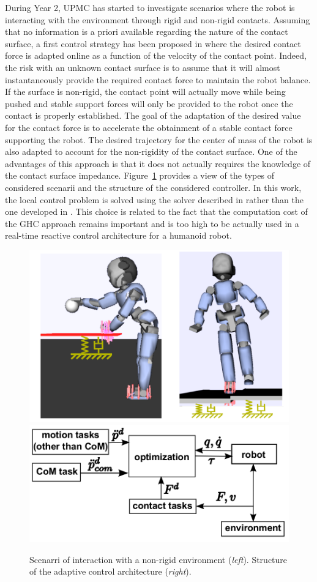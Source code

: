 During Year 2, UPMC has started to investigate scenarios where the robot is interacting with the environment through rigid and non-rigid contacts. Assuming that no information is a priori available regarding the nature of the contact surface, a first control strategy has been proposed in \cite{LiuIROS2015} where the desired contact force is adapted online as a function of the velocity of the contact point. Indeed, the risk with an unknown contact surface is to assume that it will almost instantaneously provide the required contact force to maintain the robot balance. If the surface is non-rigid, the contact point will actually move while being pushed and stable support forces will only be provided to the robot once the contact is properly established. The goal of the adaptation of the desired value for the contact force is to accelerate the obtainment of a stable contact force supporting the robot. The desired trajectory for the center of mass of the robot is also adapted to account for the non-rigidity of the contact surface. One of the advantages of this approach is that it does not actually requires the knowledge of the contact surface impedance. Figure~\ref{fig:LIU_IROS_2015} provides a view of the types of considered scenarii and the structure of the considered controller. In this work, the local control problem is solved using the solver described in \cite{salini2012} rather than the one developed in \cite{LiuGHC}. This choice is related to the fact that the computation cost of the GHC approach remains important and is too high to be actually used in a real-time reactive control architecture for a humanoid robot.\\

\begin{figure}[h!]
\centering
\includegraphics[width=0.45\linewidth]{images/LIU_IROS_2015} \includegraphics[width=0.45\linewidth]{images/LIU_IROS_2015_bis}
\caption{Scenarri of interaction with a non-rigid environment (\textit{left}). Structure of the adaptive control architecture (\textit{right}).}
\label{fig:LIU_IROS_2015}
\end{figure}

